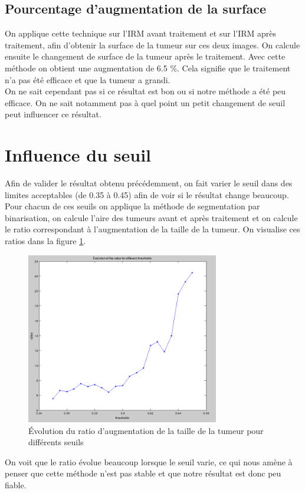 
	\subsection{Pourcentage d'augmentation de la surface} %
	\label{ssub:pourcentage_d_augmentation_de_la_surface}
		On applique cette technique sur l'IRM avant traitement et sur l'IRM après traitement, afin d'obtenir la surface de la tumeur sur ces deux images. On calcule ensuite le changement de surface de la tumeur après le traitement. Avec cette méthode on obtient une augmentation de 6.5 \%. Cela signifie que le traitement n'a pas été efficace et que la tumeur a grandi.\\

		On ne sait cependant pas si ce résultat est bon ou si notre méthode a été peu efficace. On ne sait notamment pas à quel point un petit changement de seuil peut influencer ce résultat.

\section{Influence du seuil}
	Afin de valider le résultat obtenu précédemment, on fait varier le seuil dans des limites acceptables (de 0.35 à 0.45) afin de voir si le résultat change beaucoup. Pour chacun de ces seuils on applique la méthode de segmentation par binarisation, on calcule l'aire des tumeurs avant et après traitement et on calcule le ratio correspondant à l’augmentation de la taille de la tumeur. On visualise ces ratios dans la figure \ref{fig:ratios_binarisation}.

	\begin{figure}[H]
		\centering
		\includegraphics[width=0.75\textwidth]{images/1-ratios.png}
		\caption{Évolution du ratio d'augmentation de la taille de la tumeur pour différents seuils}
		\label{fig:ratios_binarisation}
	\end{figure}

	On voit que le ratio évolue beaucoup lorsque le seuil varie, ce qui nous amène à penser que cette méthode n'est pas stable et que notre résultat est donc peu fiable.
